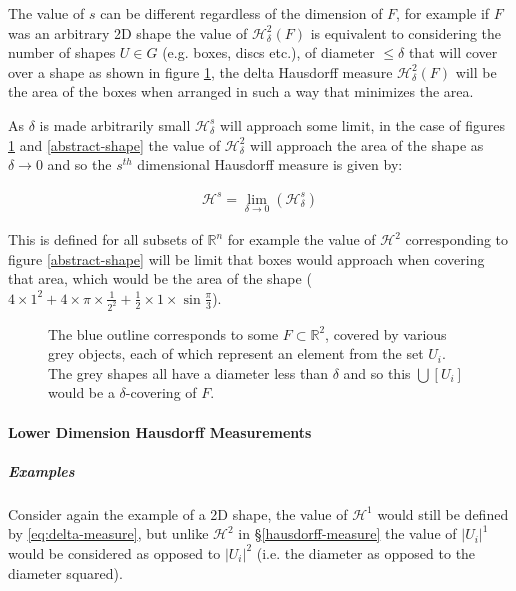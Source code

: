 \documentclass[a4paper,11pt,twoside]{article}
\begin{document}
The value of \(s\) can be different regardless of the dimension of \(F\), for example if \(F\) was an arbitrary 2D shape the value of \(\mathcal{H}_{\delta}^{2}\left(F\right)\)
is equivalent to considering the number of shapes \(U\in G\) (e.g. boxes, discs etc.), of
diameter \(\leq \delta\) that will cover over a shape as shown in figure
\ref{hausdorff-covering}, the delta Hausdorff measure
\(\mathcal{H}^{2}_{\delta} \left(F\right)\) will be the area of the boxes when
arranged in such a way that minimizes the area.

As \(\delta\) is made arbitrarily small \(\mathcal{H}_{\delta}^{s}\) will approach some limit, in the case of figures \ref{hausdorff-covering}  and \ref{abstract-shape} the value of \(\mathcal{H}^{2}_{\delta}\) will approach the area of the shape as \(\delta \rightarrow 0\) and so the \(s^{th}\) dimensional Hausdorff measure is given by:

\begin{align}
\mathcal{H}^{s} = \lim_{\delta \rightarrow 0}\left( \mathcal{H}^{s}_{\delta} \right) \label{eq:limit-haus}
\end{align}

This is defined for all subsets of \(\mathbb{R}^n\) for example the value of  \(\mathcal{H}^{2}\) corresponding to figure \ref{abstract-shape} will be limit that boxes would approach when covering that area, which would be the area of the shape (\(4\times 1^2 + 4\times \pi\times \frac{1}{2^2} + \frac{1}{2}\times 1 \times \sin{\frac{\pi}{3}}\)).





\begin{figure}
\centering

\caption{\label{hausdorff-covering}The blue outline corresponds to some \(F \subset \mathbb{R}^{2}\), covered by various grey objects, each of which represent an element from the set \(U_{i}\). The grey shapes all have a diameter less than \(\delta\) and so this  \(\bigcup \left[U_{i}\right]\) would be a \(\delta\)-covering of \(F\).}
\end{figure}




\paragraph{Lower Dimension Hausdorff Measurements}
\label{sec:org53ac80f}
\subparagraph{Examples}
\label{sec:orgdf144df}
Consider again the example of a 2D shape, the value of \(\mathcal{H}^{1}\) would still be defined by \eqref{eq:delta-measure}, but unlike \(\mathcal{H}^{2}\) in \S \ref{hausdorff-measure} the value of \(\left\lvert U_i \right\rvert^1\) would be considered as opposed to \(\left\lvert U_i \right\rvert^2\) (i.e. the diameter as opposed to the diameter squared).
\end{document}
